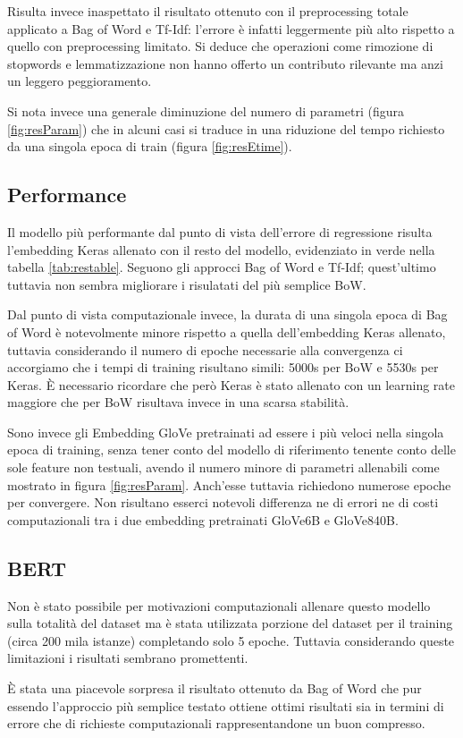 Risulta invece inaspettato il risultato ottenuto con il preprocessing totale
applicato a Bag of Word e Tf-Idf: l'errore è infatti leggermente più alto rispetto
a quello con preprocessing limitato. Si deduce che operazioni come
rimozione di stopwords e lemmatizzazione non hanno offerto un contributo
rilevante ma anzi un leggero peggioramento. 

Si nota invece una generale diminuzione del numero di parametri (figura
\ref{fig:resParam}) che in alcuni casi si traduce in una riduzione del tempo
richiesto da una singola epoca di train (figura \ref{fig:resEtime}).

\subsection{Performance}
Il modello più performante dal punto di vista dell'errore di regressione risulta
l'embedding Keras allenato con il resto del modello, evidenziato in verde nella
tabella \ref{tab:restable}. Seguono gli approcci Bag of Word e Tf-Idf;
quest'ultimo tuttavia non sembra migliorare i risulatati del più semplice BoW.

Dal punto di vista computazionale invece, la durata di una singola epoca di Bag
of Word è notevolmente minore rispetto a quella dell'embedding Keras allenato,
tuttavia considerando il numero di epoche necessarie alla convergenza ci
accorgiamo che i tempi di training risultano simili: 5000s per BoW e 5530s per
Keras. È necessario ricordare che però Keras è stato allenato con un learning
rate maggiore che per BoW risultava invece in una scarsa stabilità.

Sono invece gli Embedding GloVe pretrainati ad essere i più veloci nella singola
epoca di training, senza tener conto del modello di riferimento tenente conto
delle sole feature non testuali, avendo il numero minore di
parametri allenabili come mostrato in figura \ref{fig:resParam}. Anch'esse
tuttavia richiedono numerose epoche per convergere. Non risultano esserci
notevoli differenza ne di errori ne di costi computazionali tra i due embedding
pretrainati GloVe6B e GloVe840B.

\subsection{BERT}

Non è stato possibile per motivazioni computazionali allenare questo
modello sulla totalità del dataset ma è stata utilizzata porzione del
dataset per il training (circa 200 mila istanze) completando solo 5 epoche.
Tuttavia considerando queste limitazioni i risultati sembrano promettenti.

È stata una piacevole sorpresa il risultato ottenuto da Bag of Word che pur
essendo l'approccio più semplice testato ottiene ottimi risultati sia in termini
di errore che di richieste computazionali rappresentandone un buon compresso.